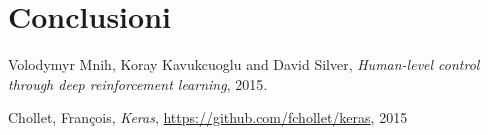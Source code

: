 \documentclass[twoside,twocolumn,10pt]{extarticle}
\theoremstyle{definition}
\begin{document}
	\section{Conclusioni}	
	
\begin{thebibliography}{99}	
		Volodymyr Mnih, Koray Kavukcuoglu and David Silver,
		\newblock \emph{Human-level control through deep reinforcement learning},
		2015.
		
		Chollet, Fran\c{c}ois,
		\newblock \emph{Keras},
		\url{https://github.com/fchollet/keras},
		2015

\end{thebibliography}
\end{document}
